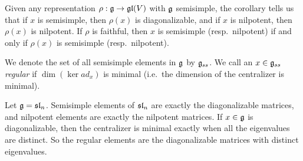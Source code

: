 Given any representation $\rho:\g\to \gl(V)$ with $\g$ semisimple, the corollary
 tells us that if $x$ is semisimple, then $\rho(x)$ is diagonalizable, and if $x$ is
 nilpotent, then $\rho(x)$ is nilpotent. If $\rho$ is faithful, then $x$ is semisimple
 (resp.\ nilpotent) if and only if $\rho(x)$ is semisimple (resp.\ nilpotent).
 \begin{definition}
 We denote the set of all semisimple elements in $\g$ by $\g_{ss}$. We call an $x\in
 \g_{ss}$ \emph{regular} if $\dim(\ker ad_x)$ is minimal (i.e.\
 the dimension of the centralizer is minimal).
 \end{definition}
 \begin{example}
   Let $\g=\sl_n$. Semisimple elements of $\sl_n$ are exactly the diagonalizable
   matrices, and nilpotent elements are exactly the nilpotent matrices. If $x\in \g$
   is diagonalizable, then the centralizer is minimal exactly when all the eigenvalues
   are distinct. So the regular elements are the diagonalizable matrices with distinct
   eigenvalues.
 \end{example}


